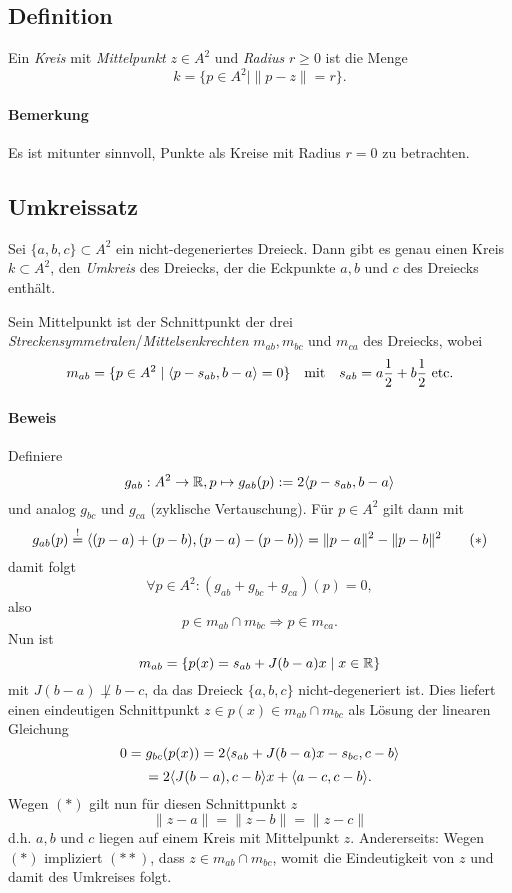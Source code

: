 \subsection{Definition}
\begin{Definition}
    Ein \emph{Kreis} mit \emph{Mittelpunkt} $ z\in A^2 $ und \emph{Radius} $ r\geq 0 $ ist die Menge
		\[ k = \{p\in A^2\mid \|p-z\| = r\}. \]
\end{Definition}
\paragraph{Bemerkung}
	Es ist mitunter sinnvoll, Punkte als Kreise mit Radius $ r=0 $ zu betrachten.
	
\subsection{Umkreissatz}
\begin{Satz}[Umkreissatz]
	Sei $ \{a,b,c\} \subset A^2 $ ein nicht-degeneriertes Dreieck. Dann gibt es genau einen Kreis $ k\subset A^2 $, den \emph{Umkreis} des Dreiecks, der die Eckpunkte $ a,b $ und $ c $ des Dreiecks enthält.
\end{Satz}	
	Sein Mittelpunkt ist der Schnittpunkt der drei \emph{Streckensymmetralen}/\emph{Mittelsenkrechten} $ m_{ab}, m_{bc}$ und $ m_{ca} $ des Dreiecks, wobei
    		\[ m_{ab} = \{p\in A^2\mid \langle p-s_{ab},b-a \rangle = 0\} \quad\text{mit}\quad s_{ab} = a\frac{1}{2}+b\frac{1}{2} \text{ etc}. \]
 
     	\begin{figure}[h]\centering
     		
    	\end{figure}

	
\paragraph{Beweis}
	Definiere
		\[ g_{ab} : A^2\to \mathbb{R}, p\mapsto g_{ab}(p):= 2\langle p-s_{ab},b-a \rangle \]
	und analog $ g_{bc} $ und $ g_{ca} $ (zyklische Vertauschung).
	Für $ p\in A^2 $ gilt dann mit
		\[ g_{ab}(p) \overset{!}{=} \langle (p-a)+(p-b),(p-a)-(p-b) \rangle  = \|p-a\|^2-\|p-b\|^2 \tag{$ * $} \]
	damit folgt
		\[ \forall p\in A^2: (g_{ab}+g_{bc}+g_{ca})(p) = 0, \]
	also
		\[ p\in m_{ab}\cap m_{bc} \Rightarrow p\in m_{ca}. \]
	Nun ist
		\[ m_{ab} = \{p(x) = s_{ab}+J(b-a)x\mid x\in \mathbb{R}\} \]
	mit $ J(b-a)\not\perp b-c $, da das Dreieck $ \{a,b,c\} $ nicht-degeneriert ist. Dies liefert einen eindeutigen Schnittpunkt $ z\in p(x)\in m_{ab}\cap m_{bc} $ als Lösung der linearen Gleichung
		\[ 0 = g_{bc}(p(x)) = 2\langle s_{ab}+J(b-a)x-s_{bc},c-b \rangle \]
		\[ = 2\langle J(b-a),c-b \rangle x+\langle a-c,c-b \rangle. \]
	Wegen $ (*) $ gilt nun für diesen Schnittpunkt $ z $
		\[ \|z-a\| = \|z-b\| = \|z-c\| \tag{$ ** $} \]
	d.h. $ a,b $ und $ c $ liegen auf einem Kreis mit Mittelpunkt $ z $.
	Andererseits: Wegen $ (*) $ impliziert $ (**) $, dass $ z\in m_{ab}\cap m_{bc} $, womit die Eindeutigkeit von $ z $ und damit des Umkreises folgt.

